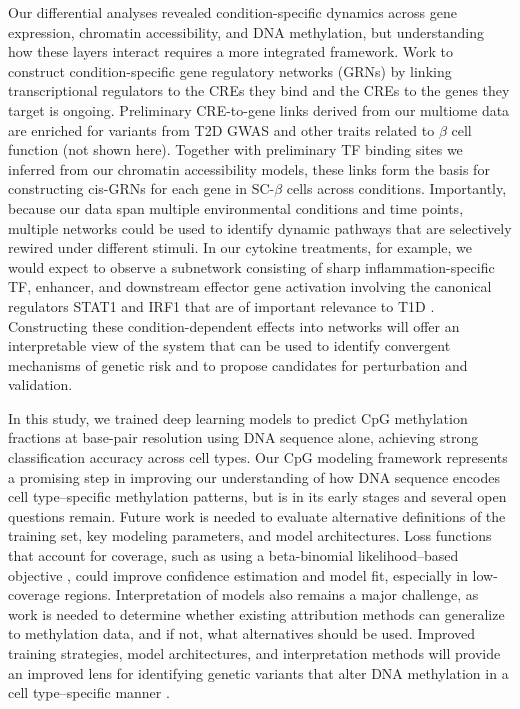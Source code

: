 Our differential analyses revealed condition-specific dynamics across gene expression, chromatin accessibility, and DNA methylation, but understanding how these layers interact requires a more integrated framework. Work to construct condition-specific gene regulatory networks (GRNs) by linking transcriptional regulators to the CREs they bind and the CREs to the genes they target \cite{Levine2005-je,Badia-I-Mompel2023-fu} is ongoing. Preliminary CRE-to-gene links derived from our multiome data are enriched for variants from T2D GWAS and other traits related to $\beta$ cell function (not shown here). Together with preliminary TF binding sites we inferred from our chromatin accessibility models, these links form the basis for constructing cis-GRNs for each gene in SC-$\beta$ cells across conditions. Importantly, because our data span multiple environmental conditions and time points, multiple networks could be used to identify dynamic pathways that are selectively rewired under different stimuli. In our cytokine treatments, for example, we would expect to observe a subnetwork consisting of sharp inflammation-specific TF, enhancer, and downstream effector gene activation involving the canonical regulators STAT1 and IRF1 that are of important relevance to T1D \cite{Benaglio2022-rq}. Constructing these condition-dependent effects into networks will offer an interpretable view of the system that can be used to identify convergent mechanisms of genetic risk \cite{Schnitzler2024-xi} and to propose candidates for perturbation and validation.

In this study, we trained deep learning models to predict CpG methylation fractions at base-pair resolution using DNA sequence alone, achieving strong classification accuracy across cell types. Our CpG modeling framework represents a promising step in improving our understanding of how DNA sequence encodes cell type–specific methylation patterns, but is in its early stages and several open questions remain. Future work is needed to evaluate alternative definitions of the training set, key modeling parameters, and model architectures. Loss functions that account for coverage, such as using a beta-binomial likelihood–based objective \cite{Dolzhenko2014-mw}, could improve confidence estimation and model fit, especially in low-coverage regions. Interpretation of models also remains a major challenge, as work is needed to determine whether existing attribution methods can generalize to methylation data, and if not, what alternatives should be used. Improved training strategies, model architectures, and interpretation methods will provide an improved lens for identifying genetic variants that alter DNA methylation in a cell type–specific manner \cite{Zeng2017-kb}.

